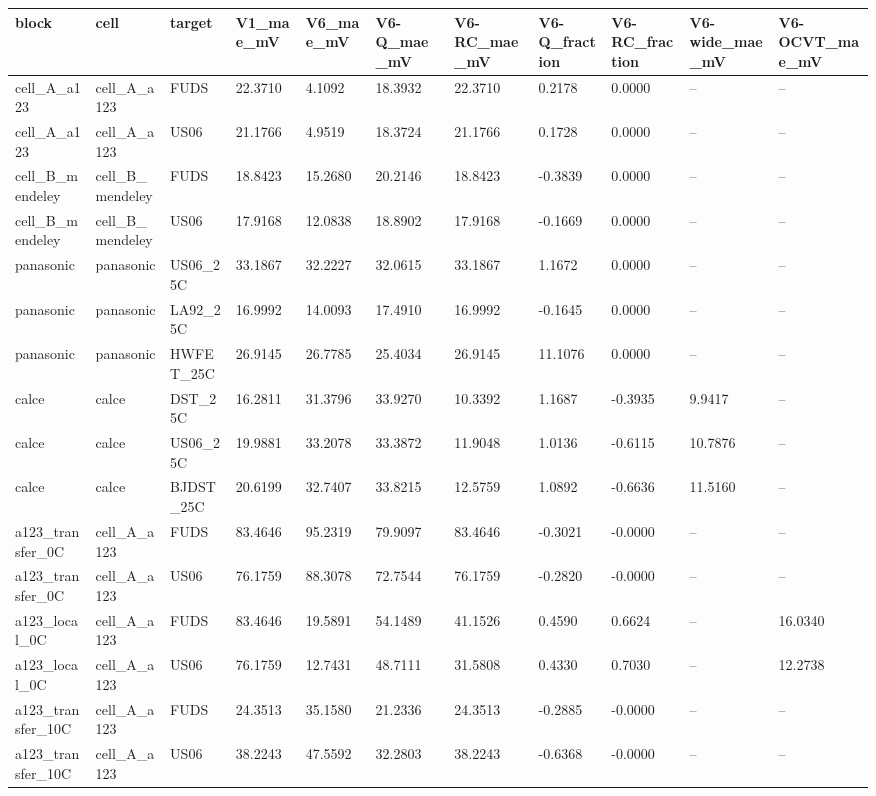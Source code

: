 \begin{tabular}{lllllllllll}
\hline
block & cell & target & V1\_mae\_mV & V6\_mae\_mV & V6-Q\_mae\_mV & V6-RC\_mae\_mV & V6-Q\_fraction & V6-RC\_fraction & V6-wide\_mae\_mV & V6-OCVT\_mae\_mV \\
\hline
cell\_A\_a123 & cell\_A\_a123 & FUDS & 22.3710 & 4.1092 & 18.3932 & 22.3710 & 0.2178 & 0.0000 & -- & -- \\
cell\_A\_a123 & cell\_A\_a123 & US06 & 21.1766 & 4.9519 & 18.3724 & 21.1766 & 0.1728 & 0.0000 & -- & -- \\
cell\_B\_mendeley & cell\_B\_mendeley & FUDS & 18.8423 & 15.2680 & 20.2146 & 18.8423 & -0.3839 & 0.0000 & -- & -- \\
cell\_B\_mendeley & cell\_B\_mendeley & US06 & 17.9168 & 12.0838 & 18.8902 & 17.9168 & -0.1669 & 0.0000 & -- & -- \\
panasonic & panasonic & US06\_25C & 33.1867 & 32.2227 & 32.0615 & 33.1867 & 1.1672 & 0.0000 & -- & -- \\
panasonic & panasonic & LA92\_25C & 16.9992 & 14.0093 & 17.4910 & 16.9992 & -0.1645 & 0.0000 & -- & -- \\
panasonic & panasonic & HWFET\_25C & 26.9145 & 26.7785 & 25.4034 & 26.9145 & 11.1076 & 0.0000 & -- & -- \\
calce & calce & DST\_25C & 16.2811 & 31.3796 & 33.9270 & 10.3392 & 1.1687 & -0.3935 & 9.9417 & -- \\
calce & calce & US06\_25C & 19.9881 & 33.2078 & 33.3872 & 11.9048 & 1.0136 & -0.6115 & 10.7876 & -- \\
calce & calce & BJDST\_25C & 20.6199 & 32.7407 & 33.8215 & 12.5759 & 1.0892 & -0.6636 & 11.5160 & -- \\
a123\_transfer\_0C & cell\_A\_a123 & FUDS & 83.4646 & 95.2319 & 79.9097 & 83.4646 & -0.3021 & -0.0000 & -- & -- \\
a123\_transfer\_0C & cell\_A\_a123 & US06 & 76.1759 & 88.3078 & 72.7544 & 76.1759 & -0.2820 & -0.0000 & -- & -- \\
a123\_local\_0C & cell\_A\_a123 & FUDS & 83.4646 & 19.5891 & 54.1489 & 41.1526 & 0.4590 & 0.6624 & -- & 16.0340 \\
a123\_local\_0C & cell\_A\_a123 & US06 & 76.1759 & 12.7431 & 48.7111 & 31.5808 & 0.4330 & 0.7030 & -- & 12.2738 \\
a123\_transfer\_10C & cell\_A\_a123 & FUDS & 24.3513 & 35.1580 & 21.2336 & 24.3513 & -0.2885 & -0.0000 & -- & -- \\
a123\_transfer\_10C & cell\_A\_a123 & US06 & 38.2243 & 47.5592 & 32.2803 & 38.2243 & -0.6368 & -0.0000 & -- & -- \\

\end{tabular}
